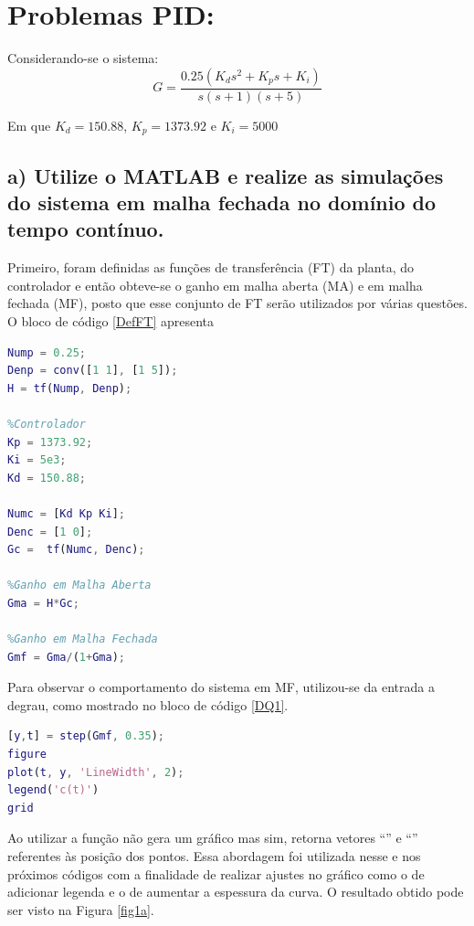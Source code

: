 \section*{Problemas PID: }
    Considerando-se o sistema:  
    \begin{equation*}
        G = \frac{0.25(K_d s^2 + K_p s +K_i)}{s(s+1)(s+5)}
    \end{equation*}
    
    Em que $K_d = 150.88$, $K_p = 1373.92$ e $K_i = 5000$
    
    \subsection*{a) Utilize o MATLAB e realize as simulações do sistema em malha 
    fechada no domínio do tempo contínuo.}

        Primeiro, foram definidas as funções de transferência (FT) da planta, do controlador e então obteve-se 
        o ganho em malha aberta (MA) e em malha fechada (MF), posto que esse conjunto de FT serão utilizados por várias
        questões. O bloco de código \ref{DefFT} apresenta

        \begin{lstlisting}[language=Matlab,label=DefFT,caption=Definindo FTs]
%Planta
Nump = 0.25;
Denp = conv([1 1], [1 5]);
H = tf(Nump, Denp);

%Controlador
Kp = 1373.92;
Ki = 5e3;
Kd = 150.88;

Numc = [Kd Kp Ki];
Denc = [1 0];
Gc =  tf(Numc, Denc);

%Ganho em Malha Aberta
Gma = H*Gc;

%Ganho em Malha Fechada
Gmf = Gma/(1+Gma);
        \end{lstlisting}

        Para observar o comportamento do sistema em MF, utilizou-se da entrada a degrau, como mostrado 
        no bloco de código \ref{DQ1}. 

        \begin{lstlisting}[language=Matlab,label=DQ1,caption=Resposta ao degrau]
%% Q a)
[y,t] = step(Gmf, 0.35);
figure
plot(t, y, 'LineWidth', 2);
legend('c(t)')
grid        
        \end{lstlisting}

        Ao utilizar  a função  não gera um gráfico
        mas sim, retorna vetores ``'' e ``'' referentes às posição dos pontos. Essa abordagem foi utilizada  
        nesse e nos próximos códigos com a finalidade de realizar ajustes no gráfico como o de adicionar legenda e o de aumentar 
        a espessura da curva. O resultado obtido pode ser visto na Figura \ref{fig1a}.

